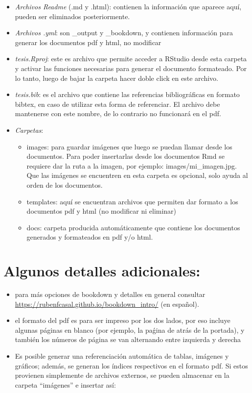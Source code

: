 \documentclass[12pt,twoside]{templates/facsothesis}
\providecommand{\tightlist}{%
  \setlength{\itemsep}{0pt}\setlength{\parskip}{0pt}}
\begin{document}
\begin{itemize}
\item
  \emph{Archivos Readme} (.md y .html): contienen la información que aparece aquí, pueden ser eliminados posteriormente.
\item
  \emph{Archivos .yml}: son \_output y \_bookdown, y contienen información para generar los documentos pdf y html, no modificar
\item
  \emph{tesis.Rproj}: este es archivo que permite acceder a RStudio desde esta carpeta y activar las funciones necesarias para generar el documento formateado. Por lo tanto, luego de bajar la carpeta hacer doble click en este archivo.
\item
  \emph{tesis.bib}: es el archivo que contiene las referencias bibliográficas en formato bibtex, en caso de utilizar esta forma de referenciar. El archivo debe mantenerse con este nombre, de lo contrario no funcionará en el pdf.
\item
  \emph{Carpetas}:

  \begin{itemize}
  \tightlist
  \item
    images: para guardar imágenes que luego se puedan llamar desde los documentos. Para poder insertarlas desde los documentos Rmd se requiere dar la ruta a la imagen, por ejemplo: images/mi\_imagen.jpg. Que las imágenes se encuentren en esta carpeta es opcional, solo ayuda al orden de los documentos.
  \item
    templates: aquí se encuentran archivos que permiten dar formato a los documentos pdf y html (no modificar ni eliminar)
  \item
    docs: carpeta producida automáticamente que contiene los documentos generados y formateados en pdf y/o html.
  \end{itemize}
\end{itemize}

\hypertarget{algunos-detalles-adicionales}{%
\section{Algunos detalles adicionales:}\label{algunos-detalles-adicionales}}

\begin{itemize}
\item
  para más opciones de bookdown y detalles en general consultar \url{https://rubenfcasal.github.io/bookdown_intro/} (en español).
\item
  el formato del pdf es para ser impreso por los dos lados, por eso incluye algunas páginas en blanco (por ejemplo, la paǵina de atrás de la portada), y también los números de página se van alternando entre izquierda y derecha
\item
  Es posible generar una referenciación automática de tablas, imágenes y gráficos; además, se generan los índices respectivos en el formato pdf. Si estos provienen simplemente de archivos externos, se pueden almacenar en la carpeta ``imágenes'' e insertar así:
\end{itemize}
\end{document}
